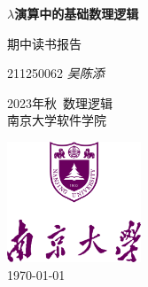 
\begin{titlepage}
    \begin{center}
        \vspace*{2.7cm}
            
        \Huge
        \textbf{$\lambda$演算中的基础数理逻辑}
            
        \vspace{1cm}
        \huge
        期中读书报告
        \vspace{1.5cm}
        \Large
            
        211250062 \textit{吴陈添}\vfill

        2023年秋\ 数理逻辑\\
        南京大学软件学院
        \vspace{1cm}  
    
        \includegraphics[width=0.3\textwidth]{templates/logo-nju.png}\\
        \vspace{1cm}  
        \Large \today
        
    \end{center}
\end{titlepage}
